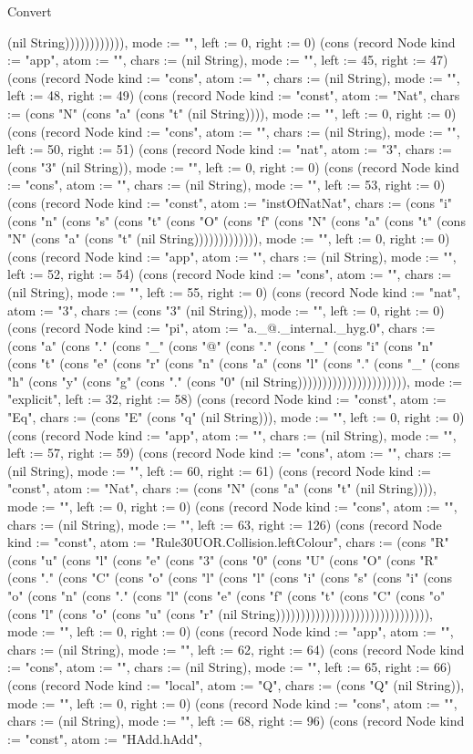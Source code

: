 \begin{lexlean}{Convert}
\begin{semanticmodule}
{(nil String)))))))))))), mode := "", left := 0, right := 0}) (cons (record Node {kind := "app", atom := "", chars := (nil String), mode := "", left := 45, right := 47}) (cons (record Node {kind := "cons", atom := "", chars := (nil String), mode := "", left := 48, right := 49}) (cons (record Node {kind := "const", atom := "Nat", chars := (cons "N" (cons "a" (cons "t" (nil String)))), mode := "", left := 0, right := 0}) (cons (record Node {kind := "cons", atom := "", chars := (nil String), mode := "", left := 50, right := 51}) (cons (record Node {kind := "nat", atom := "3", chars := (cons "3" (nil String)), mode := "", left := 0, right := 0}) (cons (record Node {kind := "cons", atom := "", chars := (nil String), mode := "", left := 53, right := 0}) (cons (record Node {kind := "const", atom := "instOfNatNat", chars := (cons "i" (cons "n" (cons "s" (cons "t" (cons "O" (cons "f" (cons "N" (cons "a" (cons "t" (cons "N" (cons "a" (cons "t" (nil String))))))))))))), mode := "", left := 0, right := 0}) (cons (record Node {kind := "app", atom := "", chars := (nil String), mode := "", left := 52, right := 54}) (cons (record Node {kind := "cons", atom := "", chars := (nil String), mode := "", left := 55, right := 0}) (cons (record Node {kind := "nat", atom := "3", chars := (cons "3" (nil String)), mode := "", left := 0, right := 0}) (cons (record Node {kind := "pi", atom := "a._@._internal._hyg.0", chars := (cons "a" (cons "." (cons "_" (cons "@" (cons "." (cons "_" (cons "i" (cons "n" (cons "t" (cons "e" (cons "r" (cons "n" (cons "a" (cons "l" (cons "." (cons "_" (cons "h" (cons "y" (cons "g" (cons "." (cons "0" (nil String)))))))))))))))))))))), mode := "explicit", left := 32, right := 58}) (cons (record Node {kind := "const", atom := "Eq", chars := (cons "E" (cons "q" (nil String))), mode := "", left := 0, right := 0}) (cons (record Node {kind := "app", atom := "", chars := (nil String), mode := "", left := 57, right := 59}) (cons (record Node {kind := "cons", atom := "", chars := (nil String), mode := "", left := 60, right := 61}) (cons (record Node {kind := "const", atom := "Nat", chars := (cons "N" (cons "a" (cons "t" (nil String)))), mode := "", left := 0, right := 0}) (cons (record Node {kind := "cons", atom := "", chars := (nil String), mode := "", left := 63, right := 126}) (cons (record Node {kind := "const", atom := "Rule30UOR.Collision.leftColour", chars := (cons "R" (cons "u" (cons "l" (cons "e" (cons "3" (cons "0" (cons "U" (cons "O" (cons "R" (cons "." (cons "C" (cons "o" (cons "l" (cons "l" (cons "i" (cons "s" (cons "i" (cons "o" (cons "n" (cons "." (cons "l" (cons "e" (cons "f" (cons "t" (cons "C" (cons "o" (cons "l" (cons "o" (cons "u" (cons "r" (nil String))))))))))))))))))))))))))))))), mode := "", left := 0, right := 0}) (cons (record Node {kind := "app", atom := "", chars := (nil String), mode := "", left := 62, right := 64}) (cons (record Node {kind := "cons", atom := "", chars := (nil String), mode := "", left := 65, right := 66}) (cons (record Node {kind := "local", atom := "Q", chars := (cons "Q" (nil String)), mode := "", left := 0, right := 0}) (cons (record Node {kind := "cons", atom := "", chars := (nil String), mode := "", left := 68, right := 96}) (cons (record Node {kind := "const", atom := "HAdd.hAdd", }
\end{semanticmodule}
\end{lexlean}
